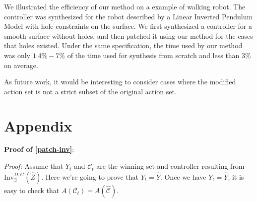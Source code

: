 We illustrated the efficiency of our method on a example of walking robot. The controller was synthesized for the robot described by a Linear Inverted Pendulum Model with hole constraints on the surface. We first synthesized a controller for a smooth surface without holes, and then patched it using our method for the cases that holes existed. Under the same specification, the time used by our method was only $ 1.4\%-7\% $ of the time used for synthesis from scratch and less than $ 3\% $ on average. 

As future work, it would be interesting to consider cases where the modified action set is not a strict subset of the original action set.  





\iffalse
\section{Appendix}
\textbf{Proof of \eqref{patch-inv}}:

\emph{Proof:}
	Assume that $ Y_t $ and $ \mathcal{C}_t $ are the winning set and controller resulting from $ \text{Inv}_{\exists}^{D,G} (\widehat{Z}) $. Here we're going to prove that $ Y_t=\widehat{Y}$. Once we have $ Y_t=\widehat{Y}$, it is easy to check that $ A(\mathcal{C}_t) = A(\widehat{\mathcal{C}}) $.
	
